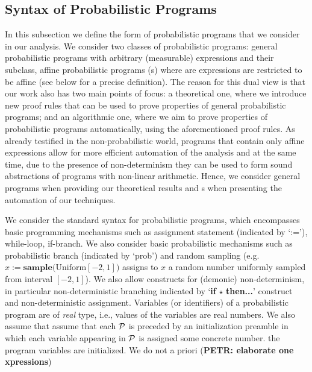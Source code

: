 

\vspace{-1em}
\subsection{Syntax of Probabilistic Programs}\label{subsec:syntax}
\vspace{-0.5em}

In this subsection we define the form of probabilistic programs that we 
consider in our analysis. We consider two classes of probabilistic programs: 
general probabilistic programs with arbitrary (measurable) expressions and 
their subclass, affine probabilistic programs (\APP s) where are expressions 
are restricted to be affine (see below for a precise definition). The reason 
for this dual view is that our work also has two main points of focus: a 
theoretical one, where we introduce new proof rules that can be used to prove 
properties of general probabilistic programs; and an algorithmic one, where we 
aim to prove properties of probabilistic programs automatically, using the 
aforementioned proof rules. As already testified in the non-probabilistic 
world, programs that contain only affine expressions allow for more efficient 
automation of the analysis and at the same time, due to the presence of 
non-determinism they can be used to form sound abstractions of programs with 
non-linear arithmetic. Hence, we consider general programs when providing our 
theoretical results and \APP s when presenting the automation of our techniques.

We consider the standard syntax for probabilistic programs,
which encompasses basic programming mechanisms such as assignment statement 
(indicated by `:='), while-loop, if-branch. We also consider basic probabilistic mechanisms 
such as probabilistic branch (indicated by `prob') and random sampling (e.g. 
$x:=\textbf{sample(}\mathrm{Uniform}[-2,1]\textbf{)}$ assigns to $x$ a random 
number 
uniformly sampled from interval $[-2,1]$). We also allow constructs for 
(demonic) non-determinism, in particular 
non-deterministic branching indicated by `\textbf{if }$\star$ \textbf{then...}' construct and non-deterministic assignment.  
Variables (or identifiers) of a probabilistic program are of \emph{real} type, i.e., 
values of the variables are real numbers. 
We also assume that assume that each \APP{} $\mathcal{P}$ is preceded by an 
initialization preamble 
in 
which 
each variable appearing in $\mathcal{P}$ is assigned some concrete number.
the program variables are initialized. We do not a priori (\textbf{PETR: 
elaborate one xpressions})

